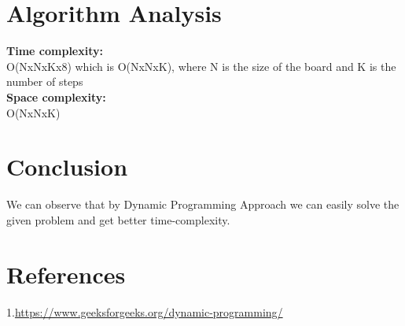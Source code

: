 \documentclass[conference]{IEEEtran}
\begin{document}
\section{Algorithm Analysis}
\textbf{Time complexity:}\\

O(NxNxKx8) which is O(NxNxK), where N is the size of the board and K is the number of steps
\\
\textbf{Space complexity:}\\

O(NxNxK)

\section{Conclusion}
We can observe that by Dynamic Programming Approach we can easily solve the given problem and get better time-complexity.

 \section{References}
\color{blue}1.{\url{https://www.geeksforgeeks.org/dynamic-programming/} }\\
\end{document}
